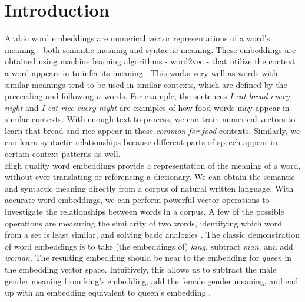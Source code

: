 \section{Introduction}
\label{sec:introduction}


Arabic word embeddings are numerical vector representations of a word's meaning - both semantic meaning and syntactic meaning. These embeddings are obtained using machine learning algorithms - word2vec - that utilize the context a word appears in to infer its meaning \cite{mikoloveffic:2013,mikolovdist:2013}. This works very well as words with similar meanings tend to be used in similar contexts, which are defined by the preceeding and following $n$ words. For example, the sentences \textit{I eat bread every night} and \textit{I eat rice every night} are examples of how food words may appear in similar contexts. With enough text to process, we can train numerical vectors to learn that bread and rice appear in these \textit{common-for-food} contexts. Similarly, we can learn syntactic relationships because different parts of speech appear in certain context patterns as well.
\\
High quality word embeddings provide a representation of the meaning of a word, without ever translating or referencing a dictionary. We can obtain the semantic and syntactic meaning directly from a corpus of natural written language. With accurate word embeddings, we can perform powerful vector operations to investigate the relationships between words in a corpus. A few of the possible operations are measuring the similarity of two words, identifying which word from a set is least similar, and solving basic analogies \cite{mikolovdist:2013}. The classic demonstration of word embeddings is to take (the embeddings of) \textit{king}, subtract \textit{man}, and add \textit{woman}. The resulting embedding should be near to the embedding for \textit{queen} in the embedding vector space. Intuitively, this allows us to subtract the male gender meaning from king's embedding, add the female gender meaning, and end up with an embedding equivalent to queen's embedding \cite{mikolov2013linguistic}.
\\
